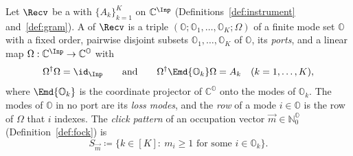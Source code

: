 \begin{definition}\label{def:port-dilation}
Let $\Recv$ be a  with
 $\{A_k\}_{k=1}^{K}$ on
$\mathbb{C}^{\Inp}$ (Definitions~\ref{def:instrument} and~\ref{def:gram}). A
 of $\Recv$ is a triple
$(\mathbb{O};\mathbb{O}_1,\dots,\mathbb{O}_K;\Omega)$ of a finite mode set
$\mathbb{O}$ with a fixed order, pairwise disjoint subsets
$\mathbb{O}_1,\dots,\mathbb{O}_K$ of $\mathbb{O}$, its \emph{ports}, and a
linear map $\Omega:\mathbb{C}^{\Inp}\to\mathbb{C}^{\mathbb{O}}$ with
\begin{equation}\label{eq:port-dilation}
  \Omega^{\dagger}\Omega=\id_{\Inp}
  \qquad\text{and}\qquad
  \Omega^{\dagger}\Emd{\mathbb{O}_k}\Omega=A_k\quad(k=1,\dots,K),
\end{equation}
where $\Emd{\mathbb{O}_k}$ is the coordinate projector of
$\mathbb{C}^{\mathbb{O}}$ onto the modes of $\mathbb{O}_k$. The modes of
$\mathbb{O}$ in no port are its \emph{loss modes}, and the \emph{row} of a mode
$i\in\mathbb{O}$ is the row of $\Omega$ that $i$ indexes. The \emph{click
pattern} of an occupation vector $\vec m\in\mathbb{N}_0^{\mathbb{O}}$
(Definition~\ref{def:fock}) is
\begin{equation}\label{eq:click-pattern-of}
  S_{\vec m}\coloneqq\big\{k\in[K]:\ m_i\ge1\text{ for some }i\in\mathbb{O}_k\big\}.
\end{equation}
\end{definition}
